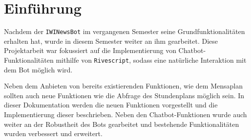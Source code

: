 \chapter{Einführung}
Nachdem der \texttt{IWINewsBot} im vergangenen Semester seine Grundfunktionalitäten erhalten hat, wurde in diesem Semester weiter an ihm gearbeitet. Diese Projektarbeit war fokussiert auf die Implementierung von Chatbot-Funktionalitäten mithilfe von \texttt{Rivescript}, sodass eine natürliche Interaktion mit dem Bot möglich wird. 

Neben dem Anbieten von bereits existierenden Funktionen, wie dem Mensaplan sollten auch neue Funktionen wie die Abfrage des Stundenplans möglich sein.
In dieser Dokumentation werden die neuen Funktionen vorgestellt und die Implementierung dieser beschrieben. Neben den Chatbot-Funktionen wurde auch weiter an der Robustheit des Bots gearbeitet und bestehende Funktionalitäten wurden verbessert und erweitert.